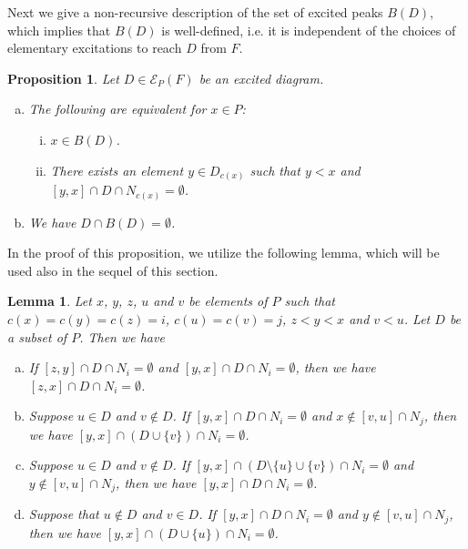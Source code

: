 \documentclass[10pt]{amsart}
\newtheorem{prop}[theo]{Proposition}
\newtheorem{lemm}[theo]{Lemma}
\theoremstyle{definition}
\theoremstyle{remark}
\newcommand\EE{\mathcal{E}}
\begin{document}
Next we give a non-recursive description of the set of excited peaks $B(D)$, 
which implies that $B(D)$ is well-defined, i.e. 
it is independent of the choices of elementary excitations to reach $D$ from $F$.

\begin{prop}
\label{prop:BD}
Let $D \in \EE_P(F)$ be an excited diagram.
\begin{enumerate}[(a)]
\item\label{prop3.7_a} %
The following are equivalent for $x \in P$:
\begin{enumerate}[(i)]
\item\label{prop3.7_a_i} %
$x \in B(D)$.
\item\label{prop3.7_a_ii} %
There exists an element $y \in D_{c(x)}$ such that $y<x$ and $[y,x] \cap D \cap N_{c(x)} = \emptyset$.
\end{enumerate}
\item\label{prop3.7_b} %
We have $D \cap B(D) = \emptyset$.
\end{enumerate}
\end{prop}

In the proof of this proposition, we utilize the following lemma, 
which will be used also in the sequel of this section.

\begin{lemm}
\label{lem:interval}
Let $x$, $y$, $z$, $u$ and $v$ be elements of $P$ such that $c(x) = c(y) = c(z) = i$, 
$c(u) = c(v) = j$,
$z<y<x$ and $v<u$.
Let $D$ be a subset of $P$.
Then we have
\begin{enumerate}[(a)]
\item\label{lemma3.8_a} %
If $[z,y] \cap D \cap N_i = \emptyset$ and $[y,x] \cap D \cap N_i = \emptyset$, 
then we have $[z,x] \cap D \cap N_i = \emptyset$.
\item\label{lemma3.8_b} %
Suppose $u \in D$ and $v \not\in D$.
If $[y,x] \cap D \cap N_i = \emptyset$ and $x \not\in [v,u] \cap N_j$, 
then we have $[y,x] \cap (D \cup \{ v \}) \cap N_i = \emptyset$.
\item\label{lemma3.8_c} %
Suppose $u \in D$ and $v \not\in D$.
If $[y,x] \cap (D \setminus \{ u \} \cup \{ v \}) \cap N_i = \emptyset$ 
and $y \not\in [v,u] \cap N_j$, 
then we have $[y,x] \cap D \cap N_i = \emptyset$.
\item\label{lemma3.8_d} %
Suppose that $u \not\in D$ and $v \in D$.
If $[y,x] \cap D \cap N_i = \emptyset$ and $y \not\in [v,u] \cap N_j$, 
then we have $[y,x] \cap (D \cup \{ u \}) \cap N_i = \emptyset$.
\end{enumerate}
\end{lemm}
\end{document}

